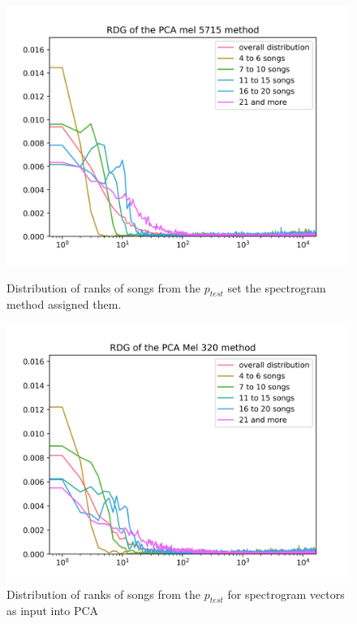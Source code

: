 \begin{figure}[hbt!]
\centering
\begin{minipage}{.5\textwidth}
  \centering
  \includegraphics[width=1\linewidth]{./img/pca_mel_5715_graph.png}
  \caption{Distribution of ranks of songs from the $p_{test}$ set the spectrogram method assigned them.}
  \label{fig:pca_mel_5715_distribution}
\end{minipage}%
\begin{minipage}{.5\textwidth}
  \centering
  \includegraphics[width=1\linewidth]{./img/pca_mel_320_graph.png}
  \caption{Distribution of ranks of songs from the $p_{test}$ for spectrogram vectors as input into PCA}
  \label{fig:pca_mel_320_distribution}
\end{minipage}
\end{figure}\label{fig:pca_mel_comparison_graps}

